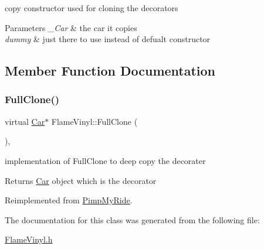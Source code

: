 copy constructor used for cloning the decorators 
\begin{DoxyParams}{Parameters}
{\em \+\_\+\+Car} & the car it copies \\
\hline
{\em dummy} & just there to use instead of defualt constructor \\
\hline
\end{DoxyParams}


\subsection{Member Function Documentation}
\mbox{\label{class_flame_vinyl_a10356b9fab01a74d2354773e0beaba8b}} 
\subsubsection{\texorpdfstring{Full\+Clone()}{FullClone()}}
{\footnotesize\ttfamily virtual \mbox{\hyperlink{class_car}{Car}}$\ast$ Flame\+Vinyl\+::\+Full\+Clone (\begin{DoxyParamCaption}{ }\end{DoxyParamCaption})\hspace{0.3cm}{\ttfamily [inline]}, {\ttfamily [virtual]}}

implementation of Full\+Clone to deep copy the decorater \begin{DoxyReturn}{Returns}
\mbox{\hyperlink{class_car}{Car}} object which is the decorator 
\end{DoxyReturn}


Reimplemented from \mbox{\hyperlink{class_pimp_my_ride_afce12a1a761727eebec707924521d0e2}{Pimp\+My\+Ride}}.



The documentation for this class was generated from the following file\+:\begin{DoxyCompactItemize}
\item 
\mbox{\hyperlink{_flame_vinyl_8h}{Flame\+Vinyl.\+h}}\end{DoxyCompactItemize}
